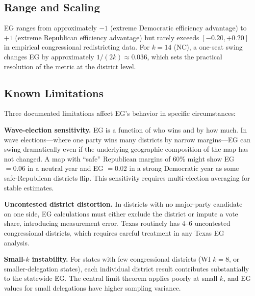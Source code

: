\subsection{Range and Scaling}

EG ranges from approximately $-1$ (extreme Democratic efficiency advantage)
to $+1$ (extreme Republican efficiency advantage) but rarely exceeds $[-0.20, +0.20]$
in empirical congressional redistricting data. For $k=14$ (NC), a one-seat swing
changes EG by approximately $1/(2k) \approx 0.036$, which sets the practical
resolution of the metric at the district level.

\subsection{Known Limitations}

Three documented limitations affect EG's behavior in specific circumstances:

\textbf{Wave-election sensitivity.} EG is a function of who wins and by how much.
In wave elections---where one party wins many districts by narrow margins---EG
can swing dramatically even if the underlying geographic composition of the map
has not changed. A map with ``safe'' Republican margins of 60\% might show EG
$= 0.06$ in a neutral year and EG $= 0.02$ in a strong Democratic year as some
safe-Republican districts flip. This sensitivity requires multi-election averaging
for stable estimates.

\textbf{Uncontested district distortion.} In districts with no major-party
candidate on one side, EG calculations must either exclude the district or
impute a vote share, introducing measurement error. Texas routinely has 4--6
uncontested congressional districts, which requires careful treatment in any
Texas EG analysis.

\textbf{Small-$k$ instability.} For states with few congressional districts
(WI $k=8$, or smaller-delegation states), each individual district result
contributes substantially to the statewide EG. The central limit theorem
applies poorly at small $k$, and EG values for small delegations have higher
sampling variance.
